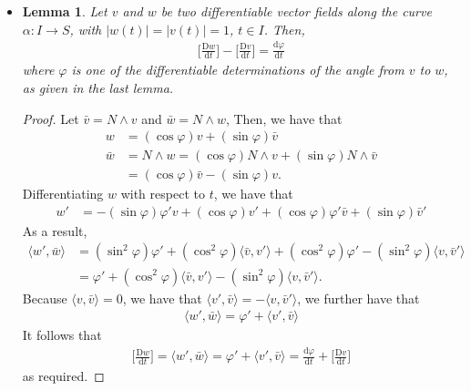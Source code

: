 \documentclass[10pt]{article}
\newtheorem{lemma}{Lemma}[section]
\newcommand{\dee}{\mathrm{d}}
\newcommand{\Dee}{\mathrm{D}}
\newcommand{\ra}{\rightarrow}
\begin{document}
\begin{itemize}
    \item \begin{lemma} \label{covariant-curvature-difference-in-terms-of-angle-difference}
        Let $v$ and $w$ be two differentiable vector fields along the curve $\alpha: I \ra S$, with $|w(t)| = |v(t)| = 1$, $t \in I$. Then,
        \begin{align*}
          \bigg[ \frac{\Dee w}{\dee t} \bigg] - \bigg[ \frac{\Dee v}{\dee t} \bigg] = \frac{\dee \varphi}{\dee t}
        \end{align*}
        where $\varphi$ is one of the differentiable determinations of the angle from $v$ to $w$, as given in the last lemma.        
      \end{lemma}
      \begin{proof}
        Let $\bar v = N \wedge v$ and $\bar w = N \wedge w$, Then, we have that
        \begin{align*}
          w &= (\cos \varphi) v + (\sin \varphi) \bar v\\
          \bar w 
          &= N \wedge w =  (\cos \varphi) N \wedge v + (\sin \varphi) N \wedge \bar v\\
          &= (\cos \varphi) \bar v - (\sin \varphi) v.
        \end{align*}
        Differentiating $w$ with respect to $t$, we have that
        \begin{align*}
          w' &= -(\sin \varphi)\varphi' v + (\cos \varphi) v' + (\cos \varphi) \varphi' \bar v + (\sin\varphi)\bar v'
        \end{align*}
        As a result,
        \begin{align*}
          \langle w', \bar w \rangle 
          &= (\sin^2 \varphi) \varphi' + (\cos^2 \varphi) \langle \bar v, v' \rangle + (\cos^2 \varphi) \varphi' - (\sin^2 \varphi) \langle v, \bar v' \rangle\\
          &= \varphi' + (\cos^2 \varphi) \langle \bar v, v' \rangle - (\sin^2 \varphi) \langle v, \bar v' \rangle.
        \end{align*}
        Because $\langle v, \bar v \rangle = 0$, we have that $\langle v', \bar v \rangle = - \langle v, \bar v' \rangle$, we further have that
        \begin{align*}
          \langle w', \bar w \rangle = \varphi' + \langle v', \bar v \rangle
        \end{align*}
        It follows that
        \begin{align*}
          \bigg[ \frac{\Dee w}{\dee t} \bigg] = \langle w', \bar w \rangle = \varphi' + \langle v', \bar v \rangle = \frac{\dee \varphi}{\dee t} + \bigg[ \frac{\Dee v}{\dee t} \bigg]
        \end{align*}
        as required.
      \end{proof}


\end{itemize}
\end{document}
